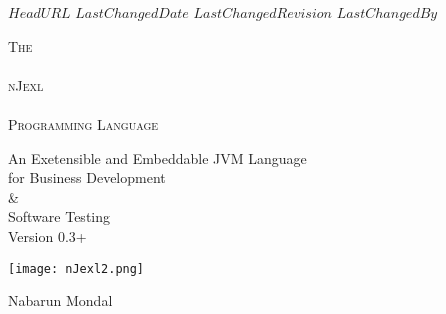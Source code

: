 \svnidlong
{$HeadURL$}
{$LastChangedDate$}
{$LastChangedRevision$}
{$LastChangedBy$}

\thispagestyle{titlepage}

\begin{center}
  \newlength{\parSepLength}
  \setlength{\parSepLength}{10ex}

  \Large
  \centering

  \thinRule\par
  \par\vspace{0.45\parSepLength}
  \begin{minipage}{\textwidth}
    \centering
    \fontsize{40pt}{30pt}\selectfont\titleColor\scshape
    The \\ ~ \\ nJexl \\ ~ \\ Programming Language  
  \end{minipage}
  \par\vspace{0.45\parSepLength}
  \par\thinRule

  \vspace{0.125\parSepLength}

  \begin{minipage}{\textwidth}
    \centering
    An Exetensible and Embeddable JVM Language \\ for Business Development \\ \& \\ Software Testing \\
    Version 0.3+
  \end{minipage}

  \vfill
 
  \begin{minipage}{0.8\textwidth}
    \centering
    \texttt{[image: nJexl2.png]}
  \end{minipage}

 \vfill
 
  \begin{minipage}{\textwidth}
    \centering
    \Large
    Nabarun Mondal 
  \end{minipage}

  \vfill

 
\end{center}
